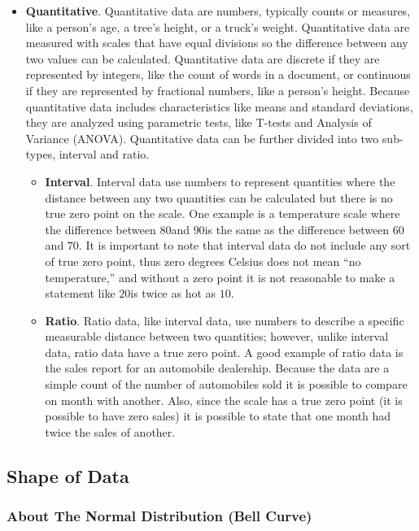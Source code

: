 \begin{itemize}
	\item \textbf{Quantitative}. Quantitative data are numbers, typically counts or measures, like a person's age, a tree's height, or a truck's weight. Quantitative data are measured with scales that have equal divisions so the difference between any two values can be calculated. Quantitative data are discrete if they are represented by integers, like the count of words in a document, or continuous if they are represented by fractional numbers, like a person's height. Because quantitative data includes characteristics like means and standard deviations, they are analyzed using parametric tests, like T-tests and Analysis of Variance (ANOVA). Quantitative data can be further divided into two sub-types, interval and ratio.
	
	\begin{itemize}
		\item \textbf{Interval}. Interval data use numbers to represent quantities where the distance between any two quantities can be calculated but there is no true zero point on the scale. One example is a temperature scale where the difference between $ 80 $\textdegree and $ 90 $\textdegree is the same as the difference between $ 60 $\textdegree and $ 70 $\textdegree. It is important to note that interval data do not include any sort of true zero point, thus zero degrees Celsius does not mean ``no temperature,'' and without a zero point it is not reasonable to make a statement like $ 20 $\textdegree is twice as hot as $ 10 $\textdegree.
		
		\item \textbf{Ratio}. Ratio data, like interval data, use numbers to describe a specific measurable distance between two quantities; however, unlike interval data, ratio data have a true zero point. A good example of ratio data is the sales report for an automobile dealership. Because the data are a simple count of the number of automobiles sold it is possible to compare on month with another. Also, since the scale has a true zero point (it is possible to have zero sales) it is possible to state that one month had twice the sales of another.
	\end{itemize}
\end{itemize}

\subsection{Shape of Data}

\subsubsection{About The Normal Distribution (Bell Curve)}\label{ch05.01}

